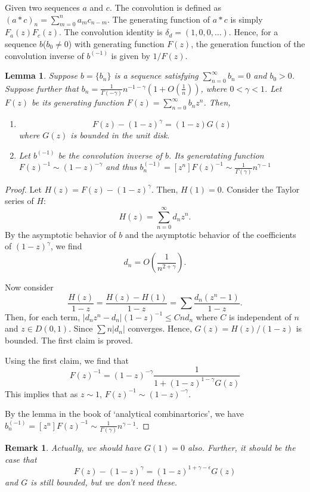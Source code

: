 \documentclass[11pt]{article}
\newtheorem{lmm}{Lemma}
\newtheorem{rmk}{Remark}
\begin{document}
Given two sequences $a$ and $c$. The convolution is defined as $(a*c)_n=\sum_{m=0}^n a_mc_{n-m}$. The generating function of $a*c$ is simply $F_a(z)F_c(z)$. The convolution identity is $\delta_d=(1,0,0,\ldots)$. Hence, for a sequence $b$($b_0\neq 0$) with generating function $F(z)$, the generation function of the convolution inverse of $b^{(-1)}$ is given by $1/F(z)$.
\begin{lmm}
Suppose $b=\{b_n\}$ is a sequence satisfying $\sum_{n=0}^{\infty}b_n=0$
and $b_0>0$. Suppose further that $b_n=\frac{1}{\Gamma(-\gamma)}n^{-1-\gamma}(1+O(\frac{1}{n}))$, where $0<\gamma<1$. Let $F(z)$ be its generating function $F(z)=\sum_{n=0}^{\infty}b_n z^n$. Then, 
\begin{enumerate}
\item $$
F(z)-(1-z)^{\gamma}=(1-z)G(z)
$$
where $G(z)$ is bounded in the unit disk.
\item Let $b^{(-1)}$ be the convolution inverse of $b$. Its generatating function $F(z)^{-1}\sim (1-z)^{-\gamma}$ and thus $b^{(-1)}_n=[z^n]F(z)^{-1}\sim \frac{1}{\Gamma(\gamma)}n^{\gamma-1}$ 
\end{enumerate}
\end{lmm}
\begin{proof}
Let $H(z)=F(z)-(1-z)^{\gamma}$. Then, $H(1)=0$. Consider the Taylor series of $H$: $$
H(z)=\sum_{n=0}^{\infty}d_n z^n.
$$
By the asymptotic behavior of $b$ and the asymptotic behavior of the coefficients of $(1-z)^{\gamma}$, we find
$$d_n=O(\frac{1}{n^{2+\gamma}}).$$ 

Now consider $$
\frac{H(z)}{1-z}=\frac{H(z)-H(1)}{1-z}=\sum \frac{d_n(z^n-1)}{1-z}.
$$
Then, for each term, 
$|d_nz^n-d_n|(1-z)^{-1}\le Cnd_n$ where $C$ is independent of $n$ and $z\in D(0,1)$. Since $\sum n|d_n|$ converges. Hence, $G(z)=H(z)/(1-z)$ is bounded. The first claim is proved.


Using the first claim, we find that $$
F(z)^{-1}=(1-z)^{-\gamma}\frac{1}{1+(1-z)^{1-\gamma}G(z)}
$$
This implies that as $z\sim 1$, $F(z)^{-1}\sim (1-z)^{-\gamma}$.

By the lemma in the book of `analytical combinartorics', we have 
$b^{(-1)}_n=[z^n]F(z)^{-1}\sim \frac{1}{\Gamma(\gamma)}n^{\gamma-1}$.
\end{proof}
\begin{rmk}
Actually, we should have $G(1)=0$ also. Further, it should be the case that 
$$
F(z)-(1-z)^{\gamma}=(1-z)^{1+\gamma-\epsilon}G(z)
$$
and $G$ is still bounded, but we don't need these.
\end{rmk}
\end{document}
